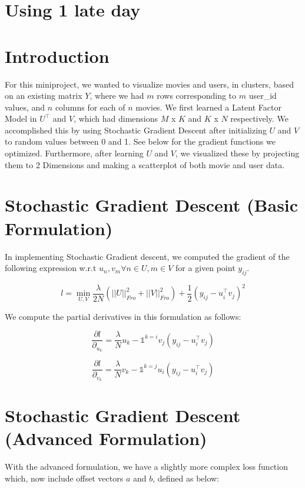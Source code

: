 \documentclass{article}
\begin{document}
\section*{Using 1 late day}
\section*{Introduction}

For this miniproject, we wanted to visualize movies and users, in clusters,
based on an existing matrix $Y$, where we had $m$ rows corresponding to $m$
user\_id values, and $n$ columns for each of $n$ movies. We first learned
a Latent Factor Model in $U^{\intercal}$ and $V$, which had dimensions
$M$ x $K$ and $K$ x $N$ respectively. We accomplished this by using Stochastic
Gradient Descent after initializing $U$ and $V$ to random values between 0 and 1.
See below for the gradient functions we optimized. Furthermore, after learning
$U$ and $V$, we visualized these by projecting them to 2 Dimensions and making
a scatterplot of both movie and user data.


\section*{Stochastic Gradient Descent (Basic Formulation)}

In implementing Stochastic Gradient descent, we computed the gradient
of the following expression w.r.t $u_{n}, v_{m} \forall n \in U, m \in V$
for a given point $y_{ij}$.

$$ l = \min_{U, V} \frac{\lambda}{2N} (||U||^{2}_{Fro} + ||V||^{2}_{Fro}) +
\frac{1}{2}(y_{ij} - u_{i}^{\intercal}v_{j})^{2} $$

We compute the partial derivatives in this formulation as follows:

$$ \frac{\partial l}{\partial_{u_{k}}} = \frac{\lambda}{N} u_{k} - \mathds{1}^{k = i} v_{j}(y_{ij} - u_{i}^{\intercal}v_{j}) $$


$$ \frac{\partial l}{\partial_{v_{k}}} = \frac{\lambda}{N} v_{k} - \mathds{1}^{k = j} u_{i}(y_{ij} - u_{i}^{\intercal}v_{j}) $$




\section*{Stochastic Gradient Descent (Advanced Formulation)}

With the advanced formulation, we have a slightly more complex loss function which,
now include offset vectors $a$ and $b$, defined as below:
\end{document}
